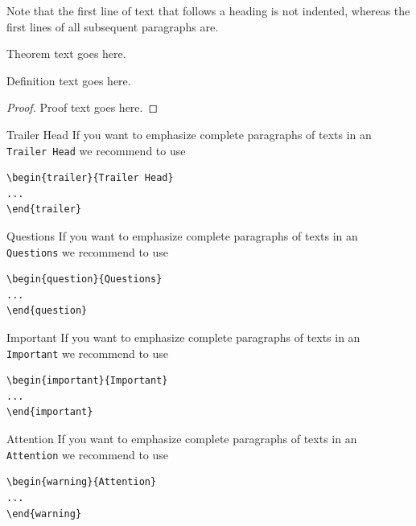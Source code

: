 \documentclass[graybox]{svmult}
\begin{document}
Note that the first line of text that follows a heading is not indented, whereas the first lines of all subsequent paragraphs are.
%
%
\begin{theorem}
Theorem text goes here.
\end{theorem}
%
\begin{definition}
Definition text goes here.
\end{definition}
%
\begin{proof}
Proof text goes here.
\end{proof}
%
\begin{trailer}{Trailer Head}
If you want to emphasize complete paragraphs of texts in an \verb|Trailer Head| we recommend to
use  \begin{verbatim}\begin{trailer}{Trailer Head}
...
\end{trailer}\end{verbatim}
\end{trailer}
%
\begin{question}{Questions}
If you want to emphasize complete paragraphs of texts in an \verb|Questions| we recommend to
use  \begin{verbatim}\begin{question}{Questions}
...
\end{question}\end{verbatim}
\end{question}
\eject%
\begin{important}{Important}
If you want to emphasize complete paragraphs of texts in an \verb|Important| we recommend to
use  \begin{verbatim}\begin{important}{Important}
...
\end{important}\end{verbatim}
\end{important}
%
\begin{warning}{Attention}
If you want to emphasize complete paragraphs of texts in an \verb|Attention| we recommend to
use  \begin{verbatim}\begin{warning}{Attention}
...
\end{warning}\end{verbatim}
\end{warning}
\end{document}
